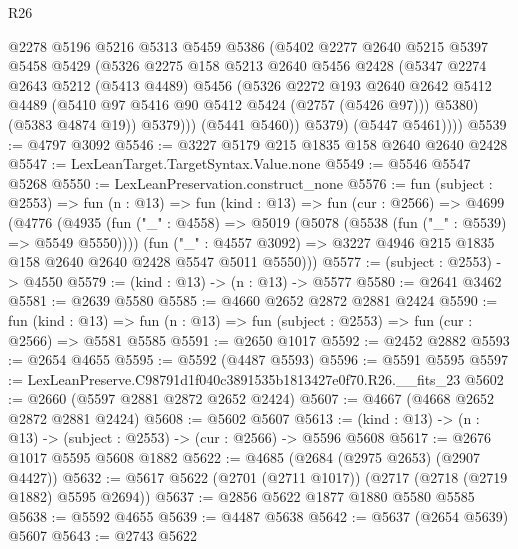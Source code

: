 \begin{lexlean}{R26}
\begin{coremodule}
                @2278
                @5196
                @5216
                @5313
                @5459
                @5386
                (@5402
                  @2277
                  @2640
                  @5215
                  @5397
                  @5458
                  @5429
                  (@5326
                    @2275
                    @158
                    @5213
                    @2640
                    @5456
                    @2428
                    (@5347
                      @2274
                      @2643
                      @5212
                      (@5413 @4489)
                      @5456
                      (@5326
                        @2272
                        @193
                        @2640
                        @2642
                        @5412
                        @4489
                        (@5410 @97 @5416 @90 @5412 @5424 (@2757 (@5426 @97)))
                        @5380)
                      (@5383 @4874 @19))
                    @5379)))
              (@5441 @5460))
            @5379)
          (@5447 @5461))))
@5539 := @4797 @3092
@5546 := @3227 @5179 @215 @1835 @158 @2640 @2640 @2428
@5547 := LexLeanTarget.TargetSyntax.Value.none
@5549 := @5546 @5547 @5268
@5550 := LexLeanPreservation.construct_none
@5576 := fun (subject : @2553) =>
  fun (n : @13) =>
  fun (kind : @13) =>
  fun (cur : @2566) =>
  @4699
    (@4776
      (@4935
        (fun ("_" : @4558) => @5019 (@5078 (@5538 (fun ("_" : @5539) => @5549 @5550))))
        (fun ("_" : @4557 @3092) =>
        @3227 @4946 @215 @1835 @158 @2640 @2640 @2428 @5547 @5011 @5550)))
@5577 := (subject : @2553) -> @4550
@5579 := (kind : @13) -> (n : @13) -> @5577
@5580 := @2641 @3462
@5581 := @2639 @5580
@5585 := @4660 @2652 @2872 @2881 @2424
@5590 := fun (kind : @13) =>
  fun (n : @13) => fun (subject : @2553) => fun (cur : @2566) => @5581 @5585
@5591 := @2650 @1017
@5592 := @2452 @2882
@5593 := @2654 @4655
@5595 := @5592 (@4487 @5593)
@5596 := @5591 @5595
@5597 := LexLeanPreserve.C98791d1f040c3891535b1813427e0f70.R26.__fits_23
@5602 := @2660 (@5597 @2881 @2872 @2652 @2424)
@5607 := @4667 (@4668 @2652 @2872 @2881 @2424)
@5608 := @5602 @5607
@5613 := (kind : @13) -> (n : @13) -> (subject : @2553) -> (cur : @2566) -> @5596 @5608
@5617 := @2676 @1017 @5595 @5608 @1882
@5622 := @4685 (@2684 (@2975 @2653) (@2907 @4427))
@5632 := @5617 @5622 (@2701 (@2711 @1017)) (@2717 (@2718 (@2719 @1882) @5595 @2694))
@5637 := @2856 @5622 @1877 @1880 @5580 @5585
@5638 := @5592 @4655
@5639 := @4487 @5638
@5642 := @5637 (@2654 @5639) @5607
@5643 := @2743 @5622

\end{coremodule}
\end{lexlean}
